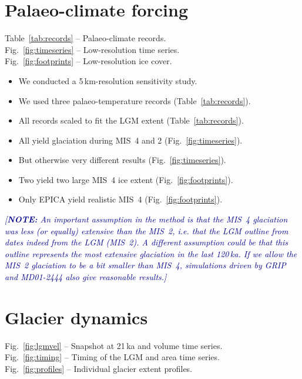 \documentclass{article}
\newcommand{\note}[1]{\textcolor{darkblue}{\emph{[\textbf{NOTE:} #1]}}}
\begin{document}
\section{Palaeo-climate forcing}

    Table~\ref{tab:records} -- Palaeo-climate records.\\
    Fig.~\ref{fig:timeseries} -- Low-resolution time series.\\
    Fig.~\ref{fig:footprints} -- Low-resolution ice cover.

    \begin{itemize}
    \item We conducted a 5\,km-resolution sensitivity study.
    \item We used three palaeo-temperature records (Table~\ref{tab:records}).
    \item All records scaled to fit the LGM extent (Table~\ref{tab:records}).
    \item All yield glaciation during MIS~4 and 2 (Fig.~\ref{fig:timeseries}).
    \item But otherwise very different results (Fig.~\ref{fig:timeseries}).
    \item Two yield two large MIS~4 ice extent (Fig.~\ref{fig:footprints}).
    \item Only EPICA yield realistic MIS~4 (Fig.~\ref{fig:footprints}).
    \end{itemize}

    \note{An important assumption in the method is that the MIS~4 glaciation
          was less (or equally) extensive than the MIS~2, i.e. that the LGM
          outline from \citet{Ehlers.etal.2011} dates indeed from the LGM
          (MIS~2). A different assumption could be that this outline represents
          the most extensive glaciation in the last 120\,ka. If we allow the
          MIS~2 glaciation to be a bit smaller than MIS~4, simulations driven
          by GRIP and MD01-2444 also give reasonable results.}


\section{Glacier dynamics}

    Fig.~\ref{fig:lgmvel} -- Snapshot at 21\,ka and volume time series.\\
    Fig.~\ref{fig:timing} -- Timing of the LGM and area time series.\\
    Fig.~\ref{fig:profiles} -- Individual glacier extent profiles.
\end{document}

